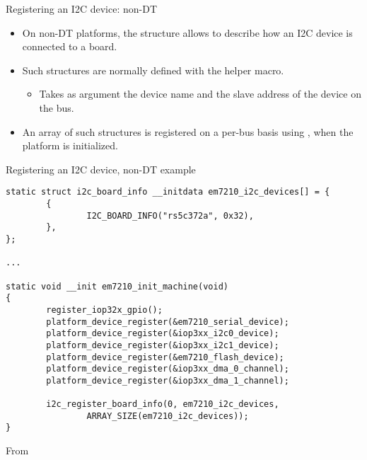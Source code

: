 \begin{frame}{Registering an I2C device: non-DT}
  \begin{itemize}
  \item On non-DT platforms, the  structure
    allows to describe how an I2C device is connected to a board.
  \item Such structures are normally defined with the
     helper macro.
    \begin{itemize}
    \item Takes as argument the device name and the slave address of
      the device on the bus.
    \end{itemize}
  \item An array of such structures is registered on a per-bus basis
    using , when the platform is
    initialized.
  \end{itemize}
\end{frame}

\begin{frame}[fragile]{Registering an I2C device, non-DT example}
  \begin{block}{}
    \begin{verbatim}
static struct i2c_board_info __initdata em7210_i2c_devices[] = {
        {
                I2C_BOARD_INFO("rs5c372a", 0x32),
        },
};

...

static void __init em7210_init_machine(void)
{
        register_iop32x_gpio();
        platform_device_register(&em7210_serial_device);
        platform_device_register(&iop3xx_i2c0_device);
        platform_device_register(&iop3xx_i2c1_device);
        platform_device_register(&em7210_flash_device);
        platform_device_register(&iop3xx_dma_0_channel);
        platform_device_register(&iop3xx_dma_1_channel);

        i2c_register_board_info(0, em7210_i2c_devices,
                ARRAY_SIZE(em7210_i2c_devices));
}
    \end{verbatim}
  \end{block}
  From 
\end{frame}

